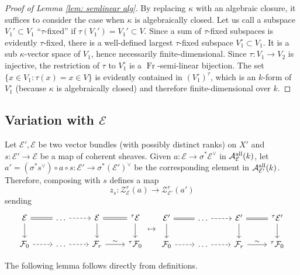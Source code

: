 \documentclass[reqno]{amsart}
\numberwithin{equation}{section}
\newcommand{\Cal}[1]{\mathcal{#1}}
\newcommand{\ft}{{}^{\tau}}
\newcommand{\co}{\colon}
\DeclareMathOperator{\Frob}{Fr}
\newcommand\cA{\mathcal{A}}
\newcommand\cE{\mathcal{E}}
\theoremstyle{remark}
\numberwithin{equation}{section}
\begin{document}
\begin{proof}[Proof of Lemma \ref{lem: semlinear alg}] By replacing $\kappa$ with an algebraic closure, it suffices to consider the case when $\kappa$ is algebraically closed. Let us call a subspace $V_1' \subset V_1$ ``$\tau$-fixed'' if $\tau(V_1') = V_1' \subset V$. Since a sum of $\tau$-fixed subspaces is evidently $\tau$-fixed, there is a well-defined largest $\tau$-fixed subspace $V^{\circ}_1 \subset V_1$. It is a sub $\kappa$-vector space of $V_1$, hence necessarily finite-dimensional. Since $\tau:V_1\to V_2$ is injective, the restriction of  $\tau$ to $V_1^{\circ}$ is a $\Frob$-semi-linear bijection. The set $\{ x \in V_1 \co \tau(x) = x  \in V\}$ is evidently contained in $(V_1^{\circ})^{\tau}$, which is an $k$-form of $V_1^{\circ}$ (because $\kappa$ is algebraically closed) and therefore finite-dimensional over $k$. 
\end{proof}

\subsection{Variation with $\cE$} 
Let $\cE',\cE$ be two vector bundles (with possibly distinct ranks) on $X'$ and $s \co \Cal{E}' \to \Cal{E}$ be a map of coherent sheaves. Given $a \co \Cal{E} \to \sigma^* \Cal{E}^{\vee}$ in $\cA^{\rm all}_{\cE}(k)$, let $a'  = (\sigma^{*} s^{\vee} ) \circ a \circ s \co \Cal{E}' \to \sigma^* (\Cal{E}')^{\vee}$ be the corresponding element in $\cA^{\rm all}_{\cE'}(k)$. Therefore, composing with $s$ defines a map 
\begin{equation}\label{eq: Z_E to Z_E'}
z_{s}: \Cal{Z}_{\Cal{E}}^r(a) \to \Cal{Z}_{\Cal{E}'}^r(a')
\end{equation}
sending
\[
\begin{tikzcd}
\Cal{E} \ar[d] \ar[r , equals ] &  \ldots \ar[r, dashed]  & \Cal{E} \ar[r, equals] \ar[d]  & \ft \Cal{E}   \ar[d] \\
 \Cal{F}_0 \ar[r, dashed]  & \ldots \ar[r, dashed] & \Cal{F}_r \ar[r, "\sim"] & \ft \Cal{F}_0
\end{tikzcd} \mapsto 
\begin{tikzcd}
\Cal{E}' \ar[d] \ar[r , equals ] &  \ldots \ar[r, dashed]  & \Cal{E}' \ar[r, equals]  \ar[d]  & \ft \Cal{E}'   \ar[d] \\
 \Cal{F}_0 \ar[r, dashed]  & \ldots \ar[r, dashed] & \Cal{F}_r \ar[r, "\sim"] & \ft \Cal{F}_0
\end{tikzcd}
\]

The following lemma follows directly from definitions.
\end{document}
